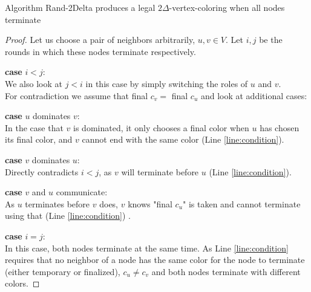 \begin{lemma}
\label{theorem:r2dproof}
  Algorithm Rand-2Delta produces a legal $2\Delta$-vertex-coloring when all nodes terminate
\end{lemma}
\begin{proof}
  Let us choose a pair of neighbors arbitrarily, $u,v \in V$. Let $i,j$ be the rounds in which these nodes terminate respectively.
	
	\textbf{case } $i < j$: \\
	We also look at $j < i$ in this case by simply switching the roles of $u$ and $v$.\\
	For contradiction we assume that final $c_v = $ final $c_u$ and look at additional cases:
	
	
	\hspace{10pt}\textbf{case } $u$ dominates $v$: \\
	In the case that $v$ is dominated, it only chooses a final color when $u$ has chosen its final color, and $v$ cannot end with the same color (Line \ref{line:condition}).
	
	\hspace{10pt}\textbf{case } $v$ dominates $u$: \\
	Directly contradicts $i < j$, as $v$ will terminate before $u$ (Line \ref{line:condition}).
	
	
	\hspace{10pt}\textbf{case } $v$ and $u$ communicate: \\
	As $u$ terminates before $v$ does, $v$ knows "final $c_u$" is taken and cannot terminate using that (Line \ref{line:condition}) .
	
	\textbf{case } $i = j$: \\
	In this case, both nodes terminate at the same time. As Line \ref{line:condition} requires that no neighbor of a node has the same color for the node to terminate (either temporary or finalized), $c_u \neq c_v$ and both nodes terminate with different colors.
\end{proof}

